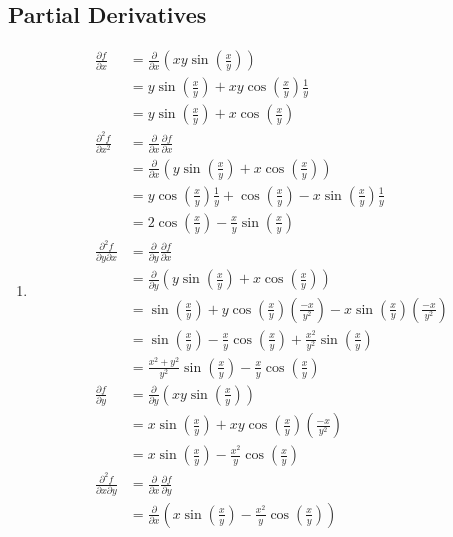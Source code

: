 
\subsection{Partial Derivatives}

\BEN

\item
\begin{enumerate}

 \item
  \begin{align*}
   \frac{\partial f}{\partial x}
   &= \frac{\partial}{\partial x}(xy \sin(\frac{x}{y})) \\
   &= y\sin(\frac{x}{y}) + xy\cos(\frac{x}{y})\frac{1}{y} \\
   &= y\sin(\frac{x}{y}) + x\cos(\frac{x}{y}) \\
   \frac{\partial^2 f}{\partial x^2}
   &= \frac{\partial}{\partial x}\frac{\partial f}{\partial x} \\
   &= \frac{\partial}{\partial x}(y\sin(\frac{x}{y}) + x\cos(\frac{x}{y})) \\
   &= y\cos(\frac{x}{y})\frac{1}{y} + \cos(\frac{x}{y}) - x\sin(\frac{x}{y})\frac{1}{y} \\
   &= 2\cos(\frac{x}{y}) - \frac{x}{y}\sin(\frac{x}{y}) \\
  \frac{\partial^2 f}{\partial y \partial x}
   &= \frac{\partial}{\partial y}\frac{\partial f}{\partial x} \\
   &= \frac{\partial}{\partial y}(y\sin(\frac{x}{y}) + x\cos(\frac{x}{y})) \\
   &= \sin(\frac{x}{y}) + y\cos(\frac{x}{y})(\frac{-x}{y^2}) - x\sin(\frac{x}{y})(\frac{-x}{y^2}) \\
   &= \sin(\frac{x}{y}) - \frac{x}{y}\cos(\frac{x}{y}) + \frac{x^2}{y^2}\sin(\frac{x}{y}) \\
   &= \frac{x^2+y^2}{y^2}\sin(\frac{x}{y}) - \frac{x}{y}\cos(\frac{x}{y}) \\
   \frac{\partial f}{\partial y}
   &= \frac{\partial}{\partial y}(xy \sin(\frac{x}{y})) \\
   &= x\sin(\frac{x}{y}) + xy\cos(\frac{x}{y})(\frac{-x}{y^2}) \\
   &= x\sin(\frac{x}{y}) - \frac{x^2}{y}\cos(\frac{x}{y}) \\
   \frac{\partial^2 f}{\partial x \partial y}
   &= \frac{\partial}{\partial x}\frac{\partial f}{\partial y} \\
   &= \frac{\partial}{\partial x}(x\sin(\frac{x}{y}) - \frac{x^2}{y}\cos(\frac{x}{y})) \\

\end{align*}
\end{enumerate}
